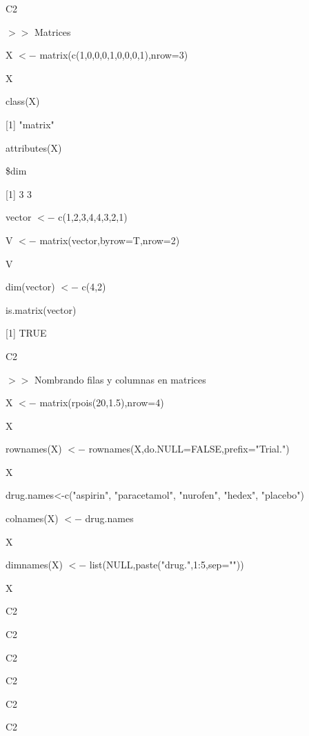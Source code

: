 \documentclass{beamer}
\theoremstyle{definition}
\theoremstyle{remark}
\begin{document}
\begin{frame}{C2}

$>>$ Matrices

X $<-$ matrix(c(1,0,0,0,1,0,0,0,1),nrow=3)

X

class(X)

[1] "matrix"

attributes(X)

\$dim

[1] 3 3


vector $<-$ c(1,2,3,4,4,3,2,1)

V $<-$ matrix(vector,byrow=T,nrow=2)

V


dim(vector) $<-$ c(4,2)

is.matrix(vector)

[1] TRUE

\end{frame}



\begin{frame}{C2}

$>>$ Nombrando filas y columnas en matrices

\hfill

X $<-$ matrix(rpois(20,1.5),nrow=4)

X

\hfill

rownames(X) $<-$ rownames(X,do.NULL=FALSE,prefix="Trial.")

X

\hfill

drug.names<-c("aspirin", "paracetamol", "nurofen", "hedex", "placebo")

colnames(X) $<-$ drug.names

X

\hfill

dimnames(X) $<-$ list(NULL,paste("drug.",1:5,sep=""))

X




\end{frame}



\begin{frame}{C2}

\end{frame}



\begin{frame}{C2}

\end{frame}



\begin{frame}{C2}

\end{frame}



\begin{frame}{C2}

\end{frame}



\begin{frame}{C2}

\end{frame}



\begin{frame}{C2}

\end{frame}
\end{document}
